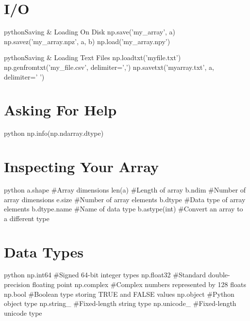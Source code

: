\section{I/O}

\begin{codebox}{python}{Saving \& Loading On Disk}
np.save('my_array', a)
np.savez('my_array.npz', a, b)
np.load('my_array.npy')
\end{codebox}

\begin{codebox}{python}{Saving \& Loading Text Files}
np.loadtxt('myfile.txt')
np.genfromtxt('my_file.csv', delimiter=',')
np.savetxt('myarray.txt', a, delimiter=' ')
\end{codebox}


\section{Asking For Help}

\begin{codebox}{python}{}
np.info(np.ndarray.dtype)
\end{codebox}


\section{Inspecting Your Array}

\begin{codebox}{python}{}
a.shape  #Array dimensions
len(a)  #Length of array
b.ndim  #Number of array dimensions
e.size  #Number of array elements
b.dtype  #Data type of array elements
b.dtype.name  #Name of data type
b.astype(int)  #Convert an array to a different type
\end{codebox}


\section{Data Types}

\begin{codebox}{python}{}
np.int64  #Signed 64-bit integer types
np.float32  #Standard double-precision floating point
np.complex  #Complex numbers represented by 128 floats
np.bool  #Boolean type storing TRUE and FALSE values
np.object  #Python object type
np.string_  #Fixed-length string type
np.unicode_  #Fixed-length unicode type
\end{codebox}


